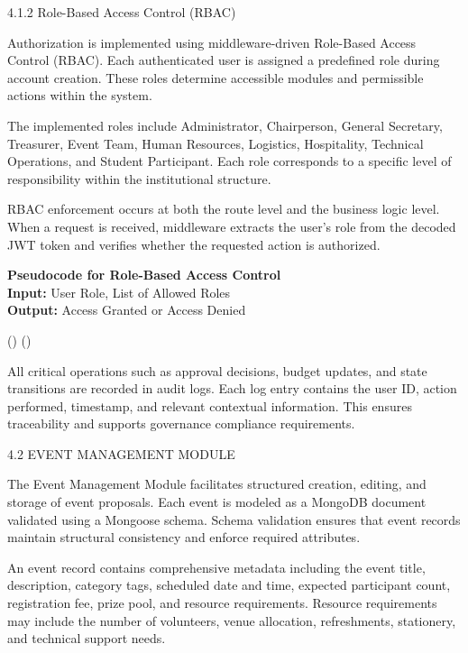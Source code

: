 4.1.2 Role-Based Access Control (RBAC)

Authorization is implemented using middleware-driven Role-Based Access Control (RBAC). Each authenticated user is assigned a predefined role during account creation. These roles determine accessible modules and permissible actions within the system.

The implemented roles include Administrator, Chairperson, General Secretary, Treasurer, Event Team, Human Resources, Logistics, Hospitality, Technical Operations, and Student Participant. Each role corresponds to a specific level of responsibility within the institutional structure.

RBAC enforcement occurs at both the route level and the business logic level. When a request is received, middleware extracts the user's role from the decoded JWT token and verifies whether the requested action is authorized.

\noindent\textbf{Pseudocode for Role-Based Access Control} 
\vspace{.2em} \\
\noindent\textbf{Input:} User Role, List of Allowed Roles\\
\noindent\textbf{Output:} Access Granted or Access Denied
\begin{algorithmic}[1]
        \State \Return {}()
    \Else
        \State \Return {}()
    \EndIf
\EndFunction
\end{algorithmic}

All critical operations such as approval decisions, budget updates, and state transitions are recorded in audit logs. Each log entry contains the user ID, action performed, timestamp, and relevant contextual information. This ensures traceability and supports governance compliance requirements.

4.2 EVENT MANAGEMENT MODULE

The Event Management Module facilitates structured creation, editing, and storage of event proposals. Each event is modeled as a MongoDB document validated using a Mongoose schema. Schema validation ensures that event records maintain structural consistency and enforce required attributes.

An event record contains comprehensive metadata including the event title, description, category tags, scheduled date and time, expected participant count, registration fee, prize pool, and resource requirements. Resource requirements may include the number of volunteers, venue allocation, refreshments, stationery, and technical support needs.

